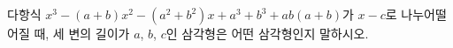 다항식 $x^3-(a+b)x^2-(a^2+b^2)x+a^3+b^3+ab(a+b)$가 $x-c$로 나누어떨어질 때, 세 변의 길이가 $a$, $b$, $c$인 삼각형은 어떤 삼각형인지 말하시오.

